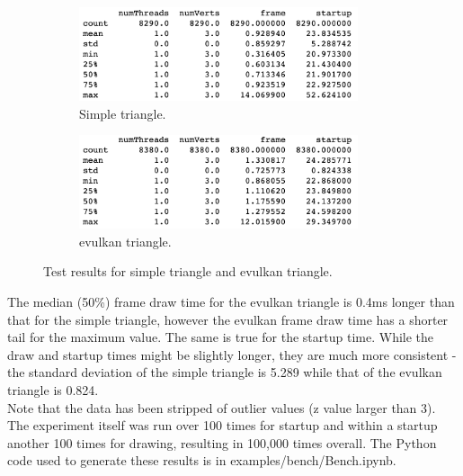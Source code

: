 \documentclass[12pt]{report}
\theoremstyle{definition}
\begin{document}
        \begin{figure}[h]
          \begin{subfigure}[b]{0.5\textwidth}
            \centering
            \includegraphics[width=0.9\textwidth]{images/simple_describe.png}
            \caption{Simple triangle.}
          \end{subfigure}
          \begin{subfigure}[b]{0.5\textwidth}
            \centering
            \includegraphics[width=0.9\textwidth]{images/evk_describe.png}
            \caption{evulkan triangle.}
          \end{subfigure}
          \caption{Test results for simple triangle and evulkan triangle.}
          \label{fig:test_describe}                        
        \end{figure}

        The median (50\%) frame draw time for the evulkan triangle is 0.4ms
        longer than that for the simple triangle, however the evulkan frame
        draw time has a shorter tail for the maximum value.  The same is true
        for the startup time. While the draw and startup times might be
        slightly longer, they are much more consistent - the standard
        deviation of the simple triangle is 5.289 while that of the evulkan
        triangle is 0.824. \\

        Note that the data has been stripped of outlier values (z value larger than 3).
        The experiment itself was run over 100 times for startup and within a startup another 100 times for drawing, resulting in 100,000 times overall.
        The Python code used to generate these results is in examples/bench/Bench.ipynb.
\end{document}

